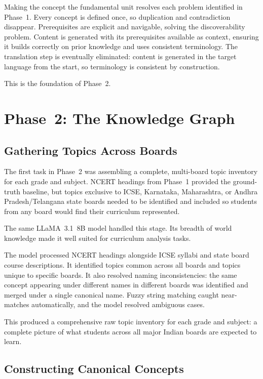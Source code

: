 \documentclass[12pt,a4paper]{article}
\begin{document}
Making the concept the fundamental unit resolves each problem identified in Phase~1.
Every concept is defined once, so duplication and contradiction disappear.
Prerequisites are explicit and navigable, solving the discoverability problem.
Content is generated with its prerequisites available as context,
ensuring it builds correctly on prior knowledge and uses consistent terminology.
The translation step is eventually eliminated: content is generated in the target
language from the start, so terminology is consistent by construction.

This is the foundation of Phase~2.

\section{Phase~2: The Knowledge Graph}

\subsection{Gathering Topics Across Boards}

The first task in Phase~2 was assembling a complete, multi-board topic inventory
for each grade and subject.
NCERT headings from Phase~1 provided the ground-truth baseline,
but topics exclusive to ICSE, Karnataka, Maharashtra, or Andhra Pradesh/Telangana
state boards needed to be identified and included so students from any board
would find their curriculum represented.

The same LLaMA~3.1~8B model handled this stage.
Its breadth of world knowledge made it well suited for curriculum analysis tasks.

The model processed NCERT headings alongside ICSE syllabi and state board course descriptions.
It identified topics common across all boards and topics unique to specific boards.
It also resolved naming inconsistencies: the same concept appearing under different names
in different boards was identified and merged under a single canonical name.
Fuzzy string matching caught near-matches automatically,
and the model resolved ambiguous cases.

This produced a comprehensive raw topic inventory for each grade and subject:
a complete picture of what students across all major Indian boards are expected to learn.

\subsection{Constructing Canonical Concepts}
\end{document}
